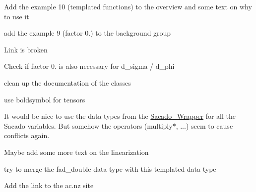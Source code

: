 
\begin{DoxyRefList}
\item[\label{todo__todo000001}%
\Hypertarget{todo__todo000001}%
page \hyperlink{index}{Trilinos\+:\+:Sacado example documentation} ]Add the example 10 (templated functions) to the overview and some text on why to use it 

add the example 9 (factor 0.) to the background group

Link is broken

Check if factor 0. is also necessary for d\+\_\+sigma / d\+\_\+phi

clean up the documentation of the classes 

use boldsymbol for tensors

It would be nice to use the data types from the \hyperlink{namespaceSacado__Wrapper}{Sacado\+\_\+\+Wrapper} for all the Sacado variables. But somehow the operators (multiply$\ast$, ...) seem to cause conflicts again.

Maybe add some more text on the linearization 

try to merge the fad\+\_\+double data type with this templated data type 

Add the link to the ac.\+nz site
\end{DoxyRefList}